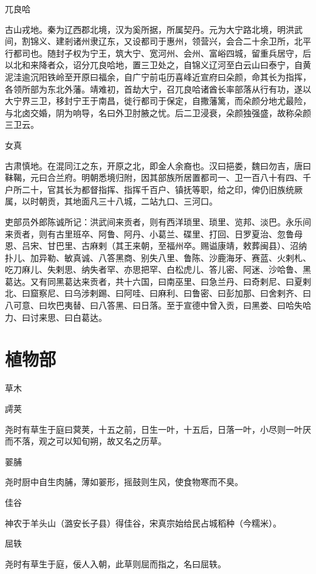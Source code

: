 \documentclass[a4paper,12pt,UTF8,twoside]{ctexbook}
\begin{document}
    兀良哈
    
    古山戎地。秦为辽西郡北境，汉为奚所据，所属契丹。元为大宁路北境，明洪武间，割锦义、建剎诸州隶辽东，又设都司于惠州，领营兴，会合二十余卫所，北平行都司也。随封子权为宁王，筑大宁、宽河州、会州、富峪四城，留重兵居守，后以北和来降者众，诏分兀良哈地，置三卫处之，自锦义辽河至白云山曰泰宁，自黄泥洼逾沉阳铁岭至开原曰福余，自广宁前屯历喜峰近宣府曰朵颜，命其长为指挥，各领所部为东北外藩。靖难初，首劫大宁，召兀良哈诸酋长率部落从行有功，遂以大宁界三卫，移封宁王于南昌，徙行都司于保定，自撒藩篱，而朵颜分地尤最险，与北卤交婚，阴为响导，名曰外卫肘腋之忧。后二卫浸衰，朵颜独强盛，故称朵颜三卫云。
    
    女真
    
    古肃慎地。在混同江之东，开原之北，即金人余裔也。汉曰挹娄，魏曰勿吉，唐曰靺鞨，元曰合兰府。明朝悉境归附，因其部族所居置都司一、卫一百八十有四、千户所二十，官其长为都督指挥、指挥千百户、镇抚等职，给之印，俾仍旧族统厥属，以时朝贡，其地面凡三十八城，二站九口、三河口。
    
    吏部员外郎陈诚所记：洪武间来贡者，则有西洋琐里、琐里、览邦、淡巴。永乐间来贡者，则有古里班卒、阿鲁、阿丹、小葛兰、碟里、打回、日罗夏治、忽鲁母恩、吕宋、甘巴里、古麻剌（其王来朝，至福州卒。赐谥康靖，敕葬闽县）、沼纳扑儿、加异勒、敏真诚、八答黑商、别失八里、鲁陈、沙鹿海牙、赛蓝、火剌札、吃刀麻儿、失剌思、纳失者罕、亦思把罕、白松虎儿、答儿密、阿迷、沙哈鲁、黑葛达。又有同黑葛达来贡者，共十六国，曰南巫里、曰急兰丹、曰奇剌尼、曰夏剌北、曰窟察尼、曰乌涉剌踢、曰阿哇、曰麻利、曰鲁密、曰彭加那、曰舍剌齐、曰八可意、曰坎巴夷替、曰八答黑、曰日落。至于宣德中曾入贡，曰黑娄、曰哈失哈力、曰讨来思、曰白葛达。
    
    \part{植物部}
    
    草木
    
    謣荚
    
    尧时有草生于庭曰蓂荚，十五之前，日生一叶，十五后，日落一叶，小尽则一叶厌而不落，观之可以知旬朔，故又名之历草。
    
    翣脯
    
    尧时厨中自生肉脯，薄如翣形，摇鼓则生风，使食物寒而不臭。
    
    佳谷
    
    神农于羊头山（潞安长子县）得佳谷，宋真宗始给民占城稻种（今糯米）。
    
    屈轶
    
    尧时有草生于庭，佞人入朝，此草则屈而指之，名曰屈轶。
    
\end{document}
